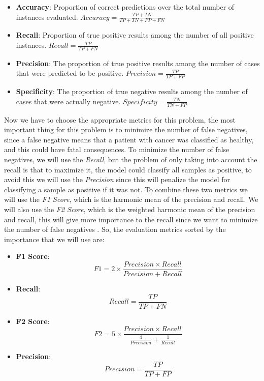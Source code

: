 \begin{itemize}
    \item \textbf{Accuracy}: Proportion of correct predictions over the total number of instances evaluated. $Accuracy = \frac{TP + TN}{TP + TN + FP + FN}$
    \item \textbf{Recall}: Proportion of true positive results among the number of all positive instances. $Recall = \frac{TP}{TP + FN}$
    \item \textbf{Precision}: The proportion of true positive results among the number of cases that were predicted to be positive. $Precision = \frac{TP}{TP + FP}$
    \item \textbf{Specificity}: The proportion of true negative results among the number of cases that were actually negative. $Specificity = \frac{TN}{TN + FP}$
\end{itemize}

Now we have to choose the appropriate metrics for this problem, the most important thing for this problem is to minimize the number of false negatives, since a false negative means that a patient with cancer was classified as healthy, and this could have fatal consequences. To minimize the number of false negatives, we will use the \textit{Recall}, but the problem of only taking into account the recall is that to maximize it, the model could classify all samples as positive, to avoid this we will use the \textit{Precision} since this will penalize the model for classifying a sample as positive if it was not. To combine these two metrics we will use the \textit{F1 Score}, which is the harmonic mean of the precision and recall. We will also use the \textit{F2 Score}, which is the weighted harmonic mean of the precision and recall, this will give more importance to the recall since we want to minimize the number of false negatives \cite{rutecki_best_nodate}. So, the evaluation metrics sorted by the importance that we will use are:

\begin{itemize}
    \item \textbf{F1 Score}: $$F1 = 2 \times \frac{Precision \times Recall}{Precision + Recall}$$
    \item \textbf{Recall}: $$Recall = \frac{TP}{TP + FN}$$
    \item \textbf{F2 Score}: $$F2 = 5 \times \frac{Precision \times Recall}{\frac{4}{Precision} + \frac{1}{Recall}}$$
    \item \textbf{Precision}: $$Precision = \frac{TP}{TP + FP}$$
\end{itemize}


